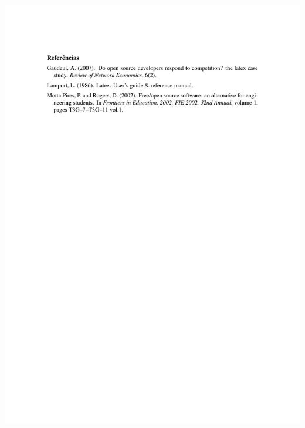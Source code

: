 {\noindent\includegraphics[trim=0 19cm 0 2cm,clip]{conteudo/intro_modelo_conferencias/references/sbc-refs}

}
